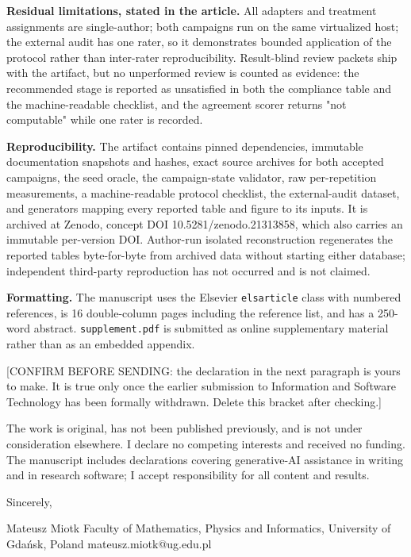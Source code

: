 \documentclass[11pt,a4paper]{article}
\begin{document}
\textbf{Residual limitations, stated in the article.} All adapters and treatment assignments are single-author; both campaigns run on the same virtualized host; the external audit has one rater, so it demonstrates bounded application of the protocol rather than inter-rater reproducibility. Result-blind review packets ship with the artifact, but no unperformed review is counted as evidence: the recommended stage is reported as unsatisfied in both the compliance table and the machine-readable checklist, and the agreement scorer returns "not computable" while one rater is recorded.

\textbf{Reproducibility.} The artifact contains pinned dependencies, immutable documentation snapshots and hashes, exact source archives for both accepted campaigns, the seed oracle, the campaign-state validator, raw per-repetition measurements, a machine-readable protocol checklist, the external-audit dataset, and generators mapping every reported table and figure to its inputs. It is archived at Zenodo, concept DOI 10.5281/zenodo.21313858, which also carries an immutable per-version DOI. Author-run isolated reconstruction regenerates the reported tables byte-for-byte from archived data without starting either database; independent third-party reproduction has not occurred and is not claimed.

\textbf{Formatting.} The manuscript uses the Elsevier \texttt{elsarticle} class with numbered references, is 16 double-column pages including the reference list, and has a 250-word abstract. \texttt{supplement.pdf} is submitted as online supplementary material rather than as an embedded appendix.

[CONFIRM BEFORE SENDING: the declaration in the next paragraph is yours to make. It is true only once the earlier submission to Information and Software Technology has been formally withdrawn. Delete this bracket after checking.]

The work is original, has not been published previously, and is not under consideration elsewhere. I declare no competing interests and received no funding. The manuscript includes declarations covering generative-AI assistance in writing and in research software; I accept responsibility for all content and results.

Sincerely,

Mateusz Miotk Faculty of Mathematics, Physics and Informatics, University of Gdańsk, Poland mateusz.miotk@ug.edu.pl
\end{document}

